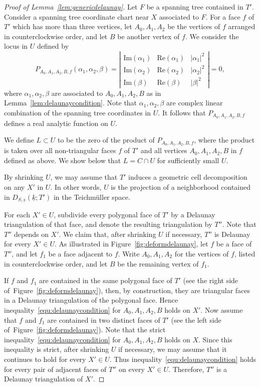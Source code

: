 \documentclass{compositio}
\numberwithin{equation}{section}
\numberwithin{figure}{section}
\theoremstyle{definition}
\theoremstyle{plain}
\begin{document}
{\begin{proof}[Proof of Lemma~\ref{lem:genericdelaunay}]
Let $F$ be a spanning tree contained in $T'$. Consider a spanning tree coordinate chart near $X$ associated to $F$. For a face $f$ of $T'$ which has more than three vertices, 
let $A_0,A_1,A_2$ be the vertices of $f$ arranged in counterclockwise order, and let $B$ be another vertex of $f$. We consider the locus in $U$ defined by
$$
P_{A_0,A_1,A_2,B,f}(\alpha_1,\alpha_2,\beta) = \left|
        \begin{array}{ccc}
        \mathrm{Im}(\alpha_1)  & \mathrm{Re}(\alpha_1) & |\alpha_1|^2 \\
        \mathrm{Im}(\alpha_2)  & \mathrm{Re}(\alpha_2) & |\alpha_2|^2 \\
        \mathrm{Im}(\beta)  & \mathrm{Re}(\beta) & |\beta|^2
        \end{array}
        \right| = 0,
$$
where $\alpha_1,\alpha_2,\beta$ are associated to $A_0,A_1,A_2, B$ as in Lemma~\ref{lem:delaunaycondition}. Note that $\alpha_1,\alpha_2,\beta$ are complex linear combination of the spanning tree coordinates in $U$. It follows that $P_{A_0,A_1,A_2,B,f}$ defines a real analytic function on $U$. 

We define $L\subset U$ to be the zero of the product of $P_{A_0,A_1,A_2,B,f}$, where the product is taken over all non-triangular faces $f$ of $T'$ and all vertices $A_0,A_1,A_2,B$ in $f$ defined as above. We show below that $L = C\cap U$ for sufficiently small $U$.

By shrinking $U$, we may assume that $T'$ induces a geometric cell decomposition on any $X'$ in $U$. In other words, $U$ is the projection of a neighborhood contained in $D_{S,\underline{s}}(\underline{k};T')$ in the Teichm\"uller space. 

For each $X' \in U$, subdivide every polygonal face of $T'$ by a Delaunay triangulation of that face, and denote the resulting triangulation by $T''$. Note that $T''$ depends on $X'$. We claim that, after shrinking $U$ if necessary, $T''$ is Delaunay for every $X' \in U$. As illustrated in Figure~\ref{fig:deformdelaunay}, let $f$ be a face of $T''$, and let $f_1$ be a face adjacent to $f$. Write $A_0,A_1,A_2$ for the vertices of $f$, listed in counterclockwise order, and let $B$ be the remaining vertex of $f_1$. 

If $f$ and $f_1$ are contained in the same polygonal face of $T'$ (see the right side of~Figure~\ref{fig:deformdelaunay}), then, by construction, they are triangular faces in a Delaunay triangulation of the polygonal face. Hence inequality~\eqref{equ:delaunaycondition} for $A_0,A_1,A_2,B$ holds on $X'$. Now assume that $f$ and $f_1$ are contained in two distinct faces of $T'$ (see the left side of~Figure~\ref{fig:deformdelaunay}). Note that the strict inequality~\eqref{equ:delaunaycondition} for $A_0,A_1,A_2,B$ holds on $X$. Since this inequality is strict, after shrinking $U$ if necessary, we may assume that it continues to hold for every $X' \in U$. Thus inequality~\eqref{equ:delaunaycondition} holds for every pair of adjacent faces of $T''$ on every $X' \in U$. Therefore, $T''$ is a Delaunay triangulation of $X'$.


\end{proof}}
\end{document}

